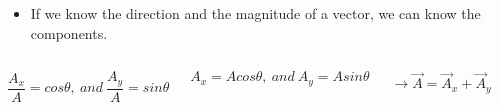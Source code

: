 \documentclass[]{beamer}
\begin{document}
\begin{frame}



\begin{itemize}
\item If we know the direction and the magnitude of a vector, we can know the components.
\end{itemize}





\begin{columns}





\begin{equation*}
 \frac{A_x}{A}=cos \theta, ~and~  \frac{A_y}{A}=sin \theta 
\end{equation*}



\begin{equation*}
 A_x=A cos \theta,~  and~  A_y=A sin \theta 
\end{equation*}

\begin{equation*}
\rightarrow \vec{A}=\vec{A}_x+\vec{A}_y
\end{equation*}



\begin{center}
     \includegraphics[width=1.\textwidth]{images/component_vec2.jpg}      
     \end{center}


\end{columns}




 \end{frame}
\end{document}
